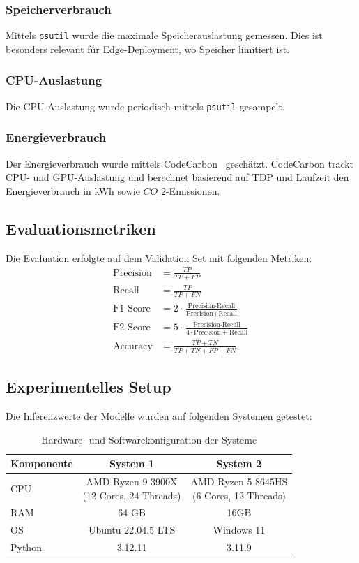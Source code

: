 \documentclass[12pt,oneside]{article}
\begin{document}
	\subsubsection{Speicherverbrauch}
	Mittels \texttt{psutil} wurde die maximale Speicherauslastung gemessen. Dies ist besonders relevant für Edge-Deployment, wo Speicher limitiert ist.
	\subsubsection{CPU-Auslastung}
	Die CPU-Auslastung wurde periodisch mittels \texttt{psutil} gesampelt.
	\subsubsection{Energieverbrauch}
	Der Energieverbrauch wurde mittels CodeCarbon~\cite{codecarbon} geschätzt. CodeCarbon trackt CPU- und GPU-Auslastung und berechnet basierend auf TDP und Laufzeit den Energieverbrauch in kWh sowie $CO\_2$-Emissionen.
	
	
	\subsection{Evaluationsmetriken}
	Die Evaluation erfolgte auf dem Validation Set mit folgenden Metriken:
	\begin{align}
		\text{Precision} &= \frac{TP}{TP + FP} \\
		\text{Recall} &= \frac{TP}{TP + FN} \\
		\text{F1-Score} &= 2 \cdot \frac{\text{Precision} \cdot \text{Recall}}{\text{Precision} + \text{Recall}} \\
		\text{F2-Score} &= 5 \cdot \frac{\text{Precision} \cdot \text{Recall}}{4 \cdot \text{Precision} + \text{Recall}} \\
		\text{Accuracy} &= \frac{TP + TN}{TP + TN + FP + FN}
	\end{align}

	\subsection{Experimentelles Setup}
	Die Inferenzwerte der Modelle wurden auf folgenden Systemen getestet:
	\begin{table}[h!]
		\centering
		\caption{Hardware- und Softwarekonfiguration der Systeme}
		\label{tab:experiment-setup}
			\begin{tabular}{lcc}
			\toprule
			\textbf{Komponente} & \textbf{System 1} & \textbf{System 2} \\
			\midrule
			CPU & \makecell{AMD Ryzen 9 3900X \\ (12 Cores, 24 Threads)} & \makecell{AMD Ryzen 5 8645HS \\ (6 Cores, 12 Threads)} \\
			RAM & 64 GB& 16GB \\
			OS & Ubuntu 22.04.5 LTS & Windows 11 \\
			Python & 3.12.11 & 3.11.9 \\
			\midrule
		\end{tabular}
	\end{table}
\end{document}
